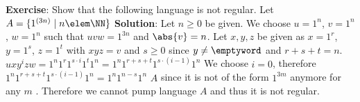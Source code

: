 \documentclass[10pt,a4paper,english]{article}
\begin{document}
    \textbf{Exercise}:\newline
    Show that the following language is not regular.\newline
    Let $A=\{ 1^{(3n)} \mid n \elem \NN \}$\newline\newline
    \textbf{Solution}:\newline
    Let $n \geq 0$ be given.\newline
    We choose $u=1^n$, $v=1^n$, $w=1^n$ such that $uvw=1^{3n}$ and $\abs{v}=n$.\newline
    Let $x,y,z$ be given as $x=1^r$, $y=1^s$, $z=1^t$ with $xyz=v$ and $s \ge 0$ since $y \neq \emptyword$ and $r+s+t=n$.\newline
    $uxy^izw=1^n 1^r 1^{s \cdot i} 1^t 1^n=1^n 1^{r+s+t} 1^{s \cdot (i-1)} 1^n$\newline
    We choose $i=0$, therefore $1^n 1^{r+s+t} 1^{s \cdot (i-1)} 1^n = 1^n 1^{n-s} 1^n$ \notelem $A$ since it is not of the form $1^{3m}$ anymore for any $m$ \elem \NN.\newline
    Therefore we cannot pump language $A$ and thus it is not regular.\newline


    \newpage
\end{document}
